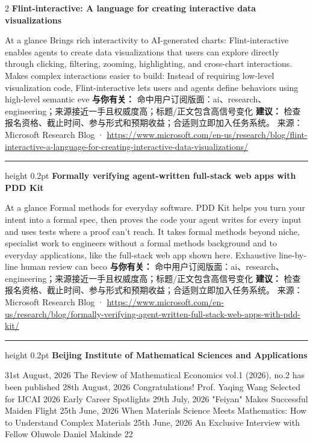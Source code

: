 \documentclass[10.5pt]{ctexart}
\begin{document}
\begin{multicols}{2}
{\large\bfseries Flint-interactive: A language for creating interactive data visualizations}\par
At a glance Brings rich interactivity to AI-generated charts: Flint-interactive enables agents to create data visualizations that users can explore directly through clicking, filtering, zooming, highlighting, and cross-chart interactions. Makes complex interactions easier to build: Instead of requiring low-level visualization code, Flint-interactive lets users and agents define behaviors using high-level semantic eve
\textbf{与你有关：} 命中用户订阅版面：ai、research、engineering；来源接近一手且权威度高；标题/正文包含高信号变化
\textbf{建议：} 检查报名资格、截止时间、参与形式和预期收益；合适则立即加入任务系统。
{\footnotesize\color{ormuted} 来源：Microsoft Research Blog · \url{https://www.microsoft.com/en-us/research/blog/flint-interactive-a-language-for-creating-interactive-data-visualizations/}}
\vspace{2mm}
\hrule height 0.2pt
\vspace{2mm}
{\large\bfseries Formally verifying agent-written full-stack web apps with PDD Kit}\par
At a glance Formal methods for everyday software. PDD Kit helps you turn your intent into a formal spec, then proves the code your agent writes for every input and uses tests where a proof can’t reach. It takes formal methods beyond niche, specialist work to engineers without a formal methods background and to everyday applications, like the full-stack web app shown here. Exhaustive line-by-line human review can beco
\textbf{与你有关：} 命中用户订阅版面：ai、research、engineering；来源接近一手且权威度高；标题/正文包含高信号变化
\textbf{建议：} 检查报名资格、截止时间、参与形式和预期收益；合适则立即加入任务系统。
{\footnotesize\color{ormuted} 来源：Microsoft Research Blog · \url{https://www.microsoft.com/en-us/research/blog/formally-verifying-agent-written-full-stack-web-apps-with-pdd-kit/}}
\vspace{2mm}
\hrule height 0.2pt
\vspace{2mm}
{\large\bfseries Beijing Institute of Mathematical Sciences and Applications}\par
31st August, 2026 The Review of Mathematical Economics vol.1 (2026), no.2 has been published 28th August, 2026 Congratulations! Prof. Yaqing Wang Selected for IJCAI 2026 Early Career Spotlights 29th July, 2026 "Feiyan" Makes Successful Maiden Flight 25th June, 2026 When Materials Science Meets Mathematics: How to Understand Complex Materials 25th June, 2026 An Exclusive Interview with Fellow Oluwole Daniel Makinde 22

\end{multicols}
\end{document}
